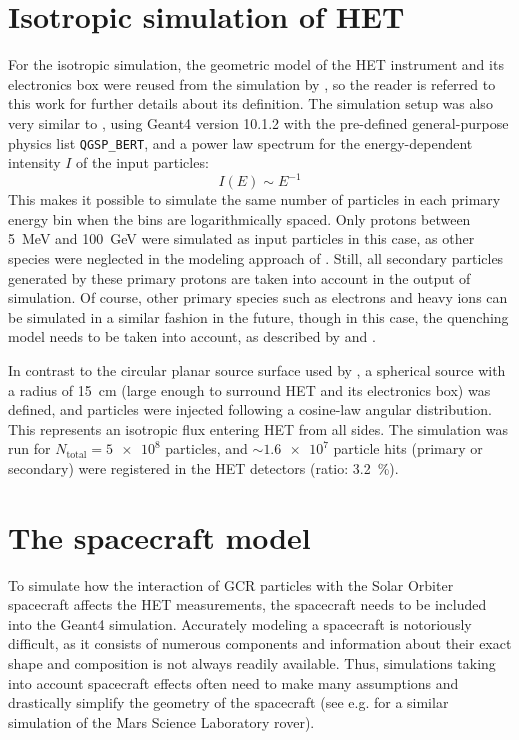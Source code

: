 \section{Isotropic simulation of HET}
\label{sec:isotropic_sim}

For the isotropic simulation, the geometric model of the HET instrument and its electronics box were reused from the simulation by \citet{Elftmann-2020-PhD}, so the reader is referred to this work for further details about its definition. The simulation setup was also very similar to \citet{Elftmann-2020-PhD}, using Geant4 version 10.1.2 with the pre-defined general-purpose physics list \texttt{QGSP\_BERT}, and a power law spectrum for the energy-dependent intensity $I$ of the input particles:
\begin{equation}
I(E) \sim E^{-1}
\label{eq:het_g4_spectrum}
\end{equation}
This makes it possible to simulate the same number of particles in each primary energy bin when the bins are logarithmically spaced. Only protons between \SI{5}{\mega\electronvolt} and \SI{100}{\giga\electronvolt} were simulated as input particles in this case, as other species were neglected in the modeling approach of \citet{Forstner-2021-SolO}. Still, all secondary particles generated by these primary protons are taken into account in the output of simulation. Of course, other primary species such as electrons and heavy ions can be simulated in a similar fashion in the future, though in this case, the quenching model needs to be taken into account, as described by \citet[Section 5.4]{Elftmann-2020-PhD} and \citet{Tammen-2015}.

In contrast to the circular planar source surface used by \citet{Elftmann-2020-PhD}, a spherical source with a radius of \SI{15}{\centi\meter} (large enough to surround HET and its electronics box) was defined, and particles were injected following a cosine-law angular distribution. This represents an isotropic flux entering HET from all sides.
The simulation was run for $N_\text{total} = \num{5e8}$ particles, and $\sim\num{1.6e7}$ particle hits (primary or secondary) were registered in the HET detectors (ratio: \SI{3.2}{\percent}).

\section{The spacecraft model}
\label{sec:spacecraft_model}

To simulate how the interaction of GCR particles with the Solar Orbiter spacecraft affects the HET measurements, the spacecraft needs to be included into the Geant4 simulation. Accurately modeling a spacecraft is notoriously difficult, as it consists of numerous components and information about their exact shape and composition is not always readily available. Thus, simulations taking into account spacecraft effects often need to make many assumptions and drastically simplify the geometry of the spacecraft (see e.g. \citet{Appel-2018-PhD,Appel-2018} for a similar simulation of the Mars Science Laboratory rover).

